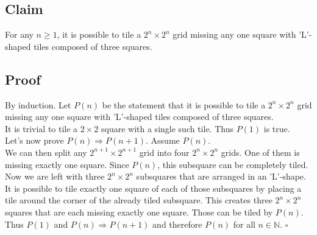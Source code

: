 \documentclass{article}
\begin{document}
\subsection*{Claim}
For any $n\geq 1$, it is possible to tile a $2^n\times 2^n$  grid missing any one square with 'L'-shaped tiles composed of three squares.
\subsection*{Proof}
By induction. Let $P(n)$ be the statement that it is possible to tile a $2^n\times 2^n$ grid missing any one square with 'L'-shaped tiles composed of three squares.\\
It is trivial to tile a $2\times 2$ square with a single such tile. Thus $P(1)$ is true.\\
Let's now prove $P(n)\Rightarrow P(n+1)$. 
Assume $P(n)$.\\
We can then split any $2^{n+1}\times 2^{n+1}$ grid into four $2^n\times 2^n$ grids. One of them is missing exactly one square. 
Since $P(n)$, this subsquare can be completely tiled. 
Now we are left with three $2^n\times 2^n$ subsquares that are arranged in an 'L'-shape.
It is possible to tile exactly one square of each of those subsquares by placing a tile around the corner of the already tiled subsquare.
This creates three $2^{n}\times 2^{n}$ squares that are each missing exactly one square. Those can be tiled by $P(n)$.\\
Thus $P(1)$ and $P(n)\Rightarrow P(n+1)$ and therefore $P(n)$ for all $n\in\mathbb{N}$. $\square$
\end{document}
